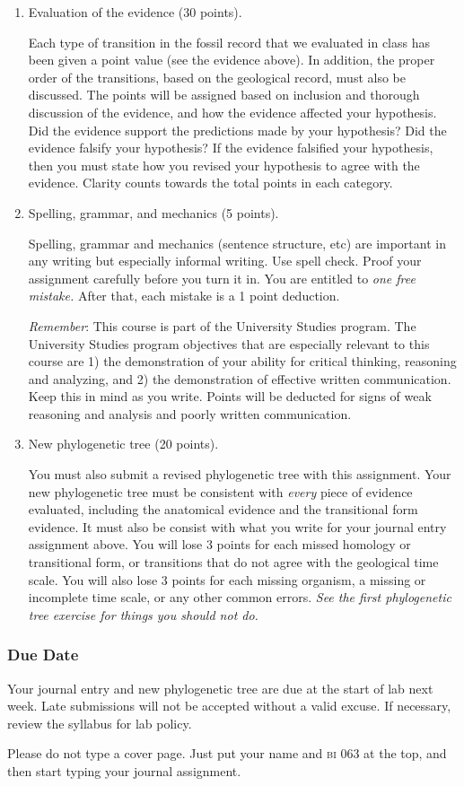 \documentclass[12pt]{exam}
\begin{document}
\begin{enumerate}

\item Evaluation of the evidence (30 points).

Each type of transition in the fossil record that we evaluated in class
has been given a point value (see the evidence above). In addition, the proper order
of the transitions, based on the geological record, must also be
discussed. The points will be assigned based on inclusion and thorough
discussion of the evidence, and how the evidence affected your
hypothesis. Did the evidence support the predictions made by your
hypothesis? Did the evidence falsify your hypothesis? If the evidence
falsified your hypothesis, then you must state how you revised your
hypothesis to agree with the evidence. Clarity counts towards the total
points in each category.

\item Spelling, grammar, and mechanics (5 points).

Spelling, grammar and mechanics (sentence structure, etc) are 
important in any writing but especially informal writing. Use spell 
check. Proof your assignment carefully before you turn it in. You 
are entitled to \emph{one free mistake.} After that, each mistake 
is a 1 point deduction.

\emph{Remember}: This course is part of the University Studies
program. The University Studies program objectives that are especially
relevant to this course are 1) the demonstration of your ability for
critical thinking, reasoning and analyzing, and 2) the demonstration of
effective written communication. Keep this in mind as you write. Points will be deducted for signs of
weak reasoning and analysis and poorly written communication.

\item New phylogenetic tree (20 points).

You must also submit a revised phylogenetic tree with this assignment. 
Your new phylogenetic tree must be consistent with \emph{every} piece of
evidence evaluated, including the anatomical evidence and the transitional
form evidence. It must also be consist with what you write
for your journal entry assignment above. You will lose 3
points for each missed homology or transitional form, or transitions that do not
agree with the geological time scale. You will also lose 3 points for each missing organism,
a missing or incomplete time scale, or any other common errors. \emph{See the first phylogenetic tree exercise for things you should not do.}

\end{enumerate}

\subsubsection*{Due Date} 

Your journal entry and new phylogenetic tree are due at the start of lab next week. Late submissions will not be accepted without a valid excuse. If necessary, review the syllabus for lab policy.

Please do not type a cover page. Just put your name and \textsc{bi} 063 at the
top, and then start typing your journal assignment.
\end{document}
